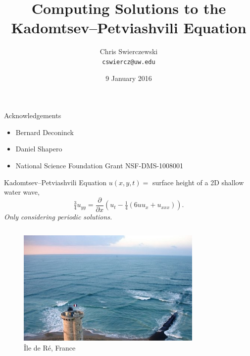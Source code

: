 \documentclass{beamer}
\title{Computing Solutions to the Kadomtsev--Petviashvili Equation}
\author{
  Chris Swierczewski\\
  {\tt cswiercz@uw.edu}
}
\date{9 January 2016}
\institute{
  Department of Applied Mathematics\\
  University of Washington\\
  Seattle, Washington
}
\begin{document}


\begin{frame}
  \titlepage
\end{frame}

\begin{frame}{Acknowledgements}{}
  \begin{itemize}
  \item Bernard Deconinck
  \item Daniel Shapero
  \item National Science Foundation Grant NSF-DMS-1008001
  \end{itemize}
\end{frame}

\begin{frame}{Kadomtsev--Petviashvili Equation}{}
  $u(x,y,t) = $ surface height of a 2D shallow water wave,
  \[
  \tfrac{3}{4} u_{yy} = \frac{\partial}{\partial x} \left(
  u_t - \tfrac{1}{4} \left(6uu_x + u_{xxx}\right) \right).
  \]
  {\it \small Only considering periodic solutions.}
  \begin{columns}[T]
    \begin{column}{0.5\textwidth}
      \begin{figure}
        \centering
        \includegraphics[width=\textwidth]{images/livekp.jpg}
        \caption{\^{I}le de R\'{e}, France}
      \end{figure}
    \end{column}
    \begin{column}{0.5\textwidth}
      \begin{figure}
        \centering

\end{figure}
\end{column}
\end{columns}
\end{frame}
\end{document}
